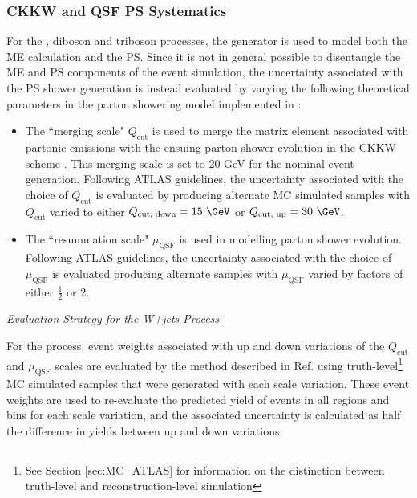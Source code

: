 \subsubsection{CKKW and QSF PS Systematics}

For the \wjets, diboson and triboson processes, the  generator is used to model both the ME calculation and the PS. Since it is not in general possible to disentangle the ME and PS components of the  event simulation, the uncertainty associated with the PS shower generation is instead evaluated by varying the following theoretical parameters in the parton showering model implemented in :

\begin{itemize}
\item The ``merging scale" \(Q_\text{cut}\) is used to merge the matrix element associated with partonic emissions with the ensuing parton shower evolution in the CKKW scheme \cite{CKKW_2009,Sherpa1.1_2009}. This merging scale is set to 20 GeV for the nominal event generation. Following ATLAS guidelines, the uncertainty associated with the choice of \(Q_\text{cut}\) is evaluated by producing alternate MC simulated samples with \(Q_\text{cut}\) varied to either \(Q_\text{cut, down}=15~\GeV\) or \(Q_\text{cut, up}=30~\GeV\). 
\item The ``resummation scale" \(\mu_\text{QSF}\) \cite{pdg_2020} is used in modelling parton shower evolution. Following ATLAS guidelines, the uncertainty associated with the choice of \(\mu_\text{QSF}\) is evaluated producing alternate samples with \(\mu_\text{QSF}\) varied by factors of either \(\frac{1}{2}\) or 2.
\end{itemize}

\vspace{1em}
\noindent\textit{Evaluation Strategy for the W+jets Process}
\vspace{1em}

For the \wjets process, event weights associated with up and down variations of the \(Q_\text{cut}\) and \(\mu_\text{QSF}\) scales are evaluated by the method described in Ref. \cite{Vjets_ckkw_qsf} using truth-level\footnote{See Section \ref{sec:MC_ATLAS} for information on the distinction between truth-level and reconstruction-level simulation} MC simulated samples that were generated with each scale variation. These event weights are used to re-evaluate the predicted yield of \wjets events in all regions and bins for each scale variation, and the associated uncertainty is calculated as half the difference in yields between up and down variations:

